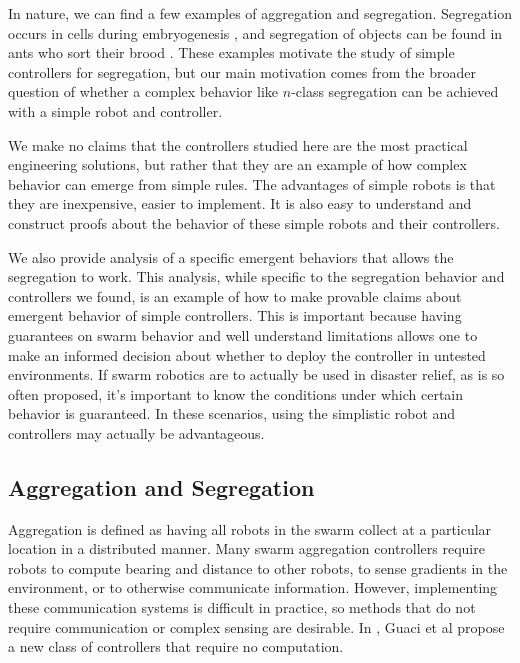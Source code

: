 \documentclass[conference]{IEEEtran}
\begin{document}
  In nature, we can find a few examples of aggregation and segregation. Segregation occurs in cells during embryogenesis \cite{batlle_molecular_2012}, and segregation of objects can be found in ants who sort their brood \cite{santos_segregation_2014}. These examples motivate the study of simple controllers for segregation, but our main motivation comes from the broader question of whether a complex behavior like $n$-class segregation can be achieved with a simple robot and controller.

  We make no claims that the controllers studied here are the most practical engineering solutions, but rather that they are an example of how complex behavior can emerge from simple rules. The advantages of simple robots is that they are inexpensive, easier to implement. It is also easy to understand and construct proofs about the behavior of these simple robots and their controllers.

  We also provide analysis of a specific emergent behaviors that allows the segregation to work. This analysis, while specific to the segregation behavior and controllers we found, is an example of how to make provable claims about emergent behavior of simple controllers. This is important because having guarantees on swarm behavior and well understand limitations allows one to make an informed decision about whether to deploy the controller in untested environments. If swarm robotics are to actually be used in disaster relief, as is so often proposed, it's important to know the conditions under which certain behavior is guaranteed. In these scenarios, using the simplistic robot and controllers may actually be advantageous.

  \subsection{Aggregation and Segregation}

    Aggregation is defined as having all robots in the swarm collect at a particular location in a distributed manner. Many swarm aggregation controllers require robots to compute bearing and distance to other robots, to sense gradients in the environment, or to otherwise communicate information. However, implementing these communication systems is difficult in practice, so methods that do not require communication or complex sensing are desirable. In \cite{gauci_self-organized_2014}, Guaci et al propose a new class of controllers that require no computation.
\end{document}
